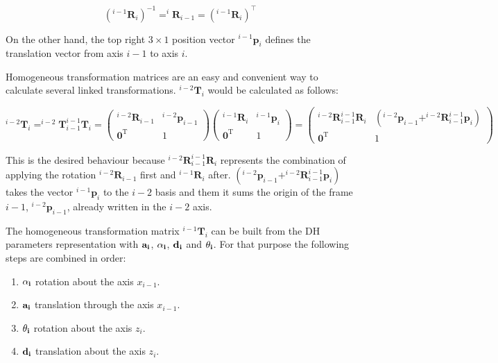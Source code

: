 $$(^{i-1} \mathbf{R}_{i})^{-1} = ^{i} \mathbf{R}_{i-1} = (^{i-1} \mathbf{R}_{i})^{\intercal}$$

On the other hand, the top right $3 \times 1$ position vector $^{i-1} \boldsymbol{p}_{i}$ defines the translation vector from axis $i-1$ to axis $i$.

Homogeneous transformation matrices are an easy and convenient way to calculate several linked transformations. $^{i-2}\mathbf{T}_{i}$ would be calculated as follows:

$$^{i-2}\mathbf{T}_{i} = ^{i-2}\mathbf{T}_{i-1} ^{i-1}\mathbf{T}_{i} =
    \left(\begin{array}{cc}
    ^{i-2} \mathbf{R}_{i-1} & ^{i-2} \boldsymbol{p}_{i-1} \\
    \mathbf{0}^{\mathrm{T}} & 1
    \end{array}\right)
    \left(\begin{array}{cc}
    ^{i-1} \mathbf{R}_{i} & ^{i-1} \boldsymbol{p}_{i} \\
    \mathbf{0}^{\mathrm{T}} & 1
    \end{array}\right) =
    \left(\begin{array}{cc}
    ^{i-2} \mathbf{R}_{i-1} ^{i-1} \mathbf{R}_{i} & (^{i-2} \boldsymbol{p}_{i-1} +  ^{i-2} \mathbf{R}_{i-1} ^{i-1} \boldsymbol{p}_{i})\\
    \mathbf{0}^{\mathrm{T}} & 1
    \end{array}\right)
$$

This is the desired behaviour because $^{i-2} \mathbf{R}_{i-1} ^{i-1} \mathbf{R}_{i}$ represents the combination of applying the rotation $^{i-2} \mathbf{R}_{i-1}$ first and $^{i-1} \mathbf{R}_{i}$ after. $(^{i-2} \boldsymbol{p}_{i-1} +  ^{i-2} \mathbf{R}_{i-1} ^{i-1} \boldsymbol{p}_{i})$ takes the vector $^{i-1} \boldsymbol{p}_{i}$ to the $i-2$ basis and them it sums the origin of the frame $i-1$, $^{i-2} \boldsymbol{p}_{i-1}$, already written in the $i-2$ axis.

The homogeneous transformation matrix $^{i-1}\mathbf{T}_{i}$ can be built from the DH parameters representation with $\bf{a_i}$, $\bf{\alpha_i}$, $\bf{d_i}$ and $\bf{\theta_i}$. For that purpose the following steps are combined in order:
\begin{enumerate}
    \item $\bf{\alpha_i}$ rotation about the axis $x_{i-1}$.
    \item $\bf{a_i}$ translation through the axis $x_{i-1}$.
    \item $\bf{\theta_i}$ rotation about the axis $z_{i}$.
    \item $\bf{d_i}$ translation about the axis $z_{i}$.
\end{enumerate}


